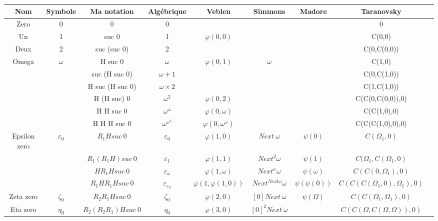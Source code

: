 \documentclass[8pt]{article}
\begin{document}
\begin{tabular}{|c|c|c|c|c|c|c|c|c|}
\hline
Nom		& Symbole		& Ma notation		& Algébrique			& Veblen			& Simmons			& Madore				& Taranovsky 			\\
\hline
Zero		& 0			& 0			& 0				& 				& 				& 					& 0				\\ \hline
Un		& 1			& suc 0			& 1				& \(\varphi(0,0)\)		& 				& 					& C(0,0)			\\ \hline
Deux		& 2			& suc (suc 0)		& 2				& 				& 				& 					& C(0,C(0,0))			\\ \hline
Omega		& \(\omega\)		& H suc 0		& \(\omega\)			& \(\varphi(0,1)\)		& \(\omega\)			& 					& C(1,0)			\\ \hline
		& 			& suc (H suc 0)		& \(\omega+1\)			& 				& 				& 					& C(0,C(1,0))			\\ \hline
		&			& H suc (H suc 0)	& \(\omega\times2\)		&				& 				& 					& C(1,C(1,0))			\\ \hline
		&			& H (H suc) 0		& \(\omega^2\)			& \(\varphi(0,2)\)		& 				& 					& C(C(0,C(0,0)),0)		\\ \hline
		&			& H H suc 0		& \(\omega^\omega\)		& \(\varphi(0,\omega)\)		& 				& 					& C(C(1,0),0)			\\ \hline
		&			& H H H suc 0		& \(\omega^{\omega^\omega}\)	& \(\varphi(0,\omega^\omega)\)	&				&					& C(C(C(1,0),0),0)		\\ \hline
Epsilon zero	& \(\varepsilon_0\)	& \(R_1 H suc\ 0\)	& \(\varepsilon_0\)		& \(\varphi(1,0)\)		& \(Next\ \omega\)		& \(\psi(0)\)				& \(C(\Omega_1,0)\)		\\ \hline
		& 			& \(R_1 (R_1 H) suc\ 0\)& \(\varepsilon_1\)		& \(\varphi(1,1)\)		& \(Next^2 \omega\)	& \(\psi(1)\)				& \(C(\Omega_1,C(\Omega_1,0)\)	\\ \hline
		& 			& \(H R_1 H suc\ 0\)	& \(\varepsilon_\omega\)	& \(\varphi(1,\omega)\) 	& \(Next^\omega \omega\) & \(\psi(\omega)\)			& \(C(C(0,\Omega_1),0)\)	\\ \hline
		& 			& \(R_1 H R_1 H suc\ 0\)&\(\varepsilon_{\varepsilon_0}\)& \(\varphi(1,\varphi(1,0))\)	& \(Next^{Next \omega} \omega \) & \(\psi(\psi(0))\)			& \(C(C(C(\Omega_1,0),\Omega_1),0)\)\\ \hline
Zeta zero	& \(\zeta_0\)		& \(R_2 R_1 H suc\ 0\)	& \(\zeta_0\)			& \(\varphi(2,0)\)		& \([0] Next\ \omega\)		& \(\psi(\Omega)\)			& \(C(C(\Omega_1,\Omega_1),0)\)	\\ \hline
Eta zero	& \(\eta_0\)		& \(R_2 (R_2 R_1) H suc\ 0\)& \(\eta_0\)			& \(\varphi(3,0)\)		& \([0]^2 Next\ \omega\) 	&					& \(C(C(\Omega,C(\Omega,\Omega)),0)\) \\ \hline

\end{tabular}
\end{document}
